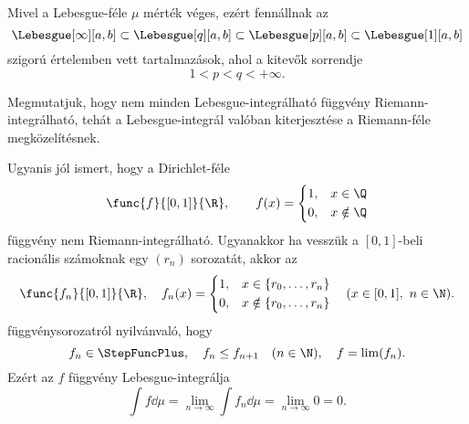 \documentclass[
]{elteikthesis}[2024/04/26]
\begin{document}
	\begin{notes}
		\item
		Mivel a Lebesgue-féle \( \mu \) mérték véges, ezért fennállnak az
		\[
			\Lebesgue[\infty][a, b] \subset
			\Lebesgue[q][a, b] \subset
			\Lebesgue[p][a, b] \subset
			\Lebesgue[1][a, b]
		\]
		szigorú értelemben vett tartalmazások, ahol a kitevők sorrendje
		\[
			1 < p < q < +\infty.
		\]
		
		\item
		Megmutatjuk, hogy nem minden Lebesgue-integrálható függvény Riemann-integrálható, 
		tehát a Lebesgue-integrál valóban kiterjesztése a Riemann-féle megközelítésnek.
		
		Ugyanis jól ismert, hogy a Dirichlet-féle
		\[
			\func{f}{[0, 1]}{\R}, \qquad
			f(x) =
			\left\{
			\begin{aligned}
				1, & \quad x \in \Q \\
				0, & \quad x \notin \Q
			\end{aligned}
			\right.
		\]
		függvény nem Riemann-integrálható. 
		Ugyanakkor ha vesszük a \( [0, 1] \)-beli racionális számoknak egy 
		\( (r_n) \) sorozatát, akkor az
		\[
			\func{f_n}{[0, 1]}{\R}, \quad
			f_n(x) =
			\left\{
			\begin{aligned}
				1, & \quad x \in \{ r_0, \dots, r_n \} \\
				0, & \quad x \notin \{ r_0, \dots, r_n \}
			\end{aligned}
			\right.
			\quad (x \in [0, 1], \ n \in \N).
		\]
		függvénysorozatról nyilvánvaló, hogy
		\[
			f_n \in \StepFuncPlus, \quad
			f_n \leq f_{n + 1} \quad (n \in \N), \quad
			f = \lim(f_n).
		\]
		Ezért az \( f \) függvény Lebesgue-integrálja
		\[
			\int f \dd{\mu} =
			\lim_{n \to \infty} \int f_n \dd{\mu} = 
			\lim_{n \to \infty} 0 = 
			0.
		\]
	\end{notes}
	
\end{document}
